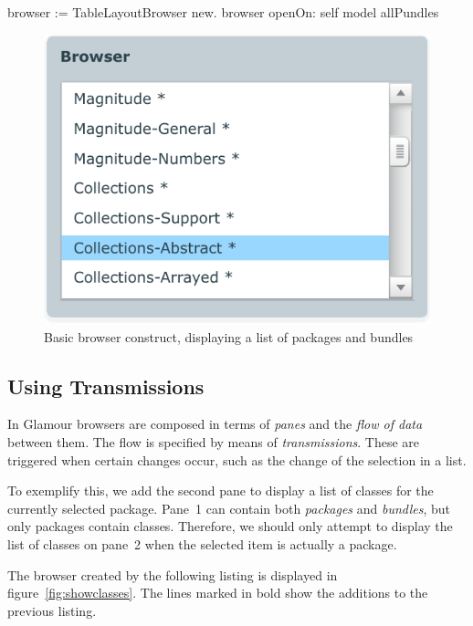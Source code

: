 \documentclass[a4paper,10pt,twoside]{book}
\begin{document}
\begin{code}{}
browser := TableLayoutBrowser new.
browser openOn: self model allPundles
\end{code}

\begin{figure}[htbp]
\centerline{\includegraphics[width=\linewidth]{helloworld.pdf}}
\caption{Basic browser construct, displaying a list of packages and bundles}
\label{fig:helloworld}
\end{figure}



\subsection{Using Transmissions}

In Glamour browsers are composed in terms of \emph{panes} and the \emph{flow of data} between them. The flow is specified by means of \emph{transmissions}. These are triggered when certain changes occur, such as the change of the selection in a list.

To exemplify this, we add the second pane to display a list of classes for the currently selected package. Pane~1 can contain both \emph{packages} and \emph{bundles}, but only packages contain classes. Therefore, we should only attempt to display the list of classes on pane~2 when the selected item is actually a package. 

The browser created by the following listing is displayed in figure~\ref{fig:showclasses}. The lines marked in bold show the additions to the previous listing.
\end{document}
